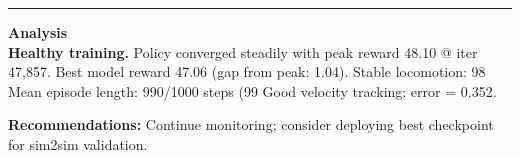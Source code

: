 \documentclass[a4paper,10pt]{article}
\begin{document}
\vspace{2pt}
\hrule
\vspace{2pt}

\footnotesize
\textbf{Analysis} \\[1pt]
\textbf{Healthy training.} Policy converged steadily with peak reward 48.10 @ iter 47,857.
Best model reward 47.06 (gap from peak: 1.04).
Stable locomotion: 98%
Mean episode length: 990/1000 steps (99%
Good velocity tracking: error = 0.352.

\textbf{Recommendations:}
Continue monitoring; consider deploying best checkpoint for sim2sim validation.
\end{document}
